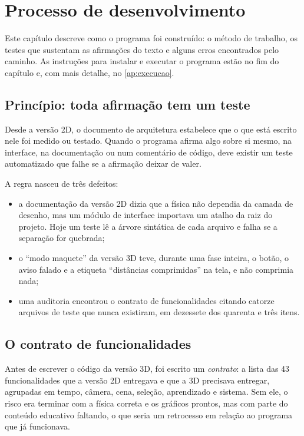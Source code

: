 \chapter{Processo de desenvolvimento}\label{cap:processo}

Este capítulo descreve como o programa foi construído: o método de trabalho, os testes que sustentam as afirmações do texto e alguns erros encontrados pelo caminho. As instruções para instalar e executar o programa estão no fim do capítulo e, com mais detalhe, no \autoref{ap:execucao}.

\section{Princípio: toda afirmação tem um teste}

Desde a versão 2D, o documento de arquitetura estabelece que o que está escrito nele foi medido ou testado. Quando o programa afirma algo sobre si mesmo, na interface, na documentação ou num comentário de código, deve existir um teste automatizado que falhe se a afirmação deixar de valer.

A regra nasceu de três defeitos:

\begin{itemize}
  \item a documentação da versão 2D dizia que a física não dependia da camada de desenho, mas um módulo de interface importava um atalho da raiz do projeto. Hoje um teste lê a árvore sintática de cada arquivo e falha se a separação for quebrada;
  \item o ``modo maquete'' da versão 3D teve, durante uma fase inteira, o botão, o aviso falado e a etiqueta ``distâncias comprimidas'' na tela, e não comprimia nada;
  \item uma auditoria encontrou o contrato de funcionalidades citando catorze arquivos de teste que nunca existiram, em dezessete dos quarenta e três itens.
\end{itemize}

\section{O contrato de funcionalidades}\label{sec:contrato}

Antes de escrever o código da versão 3D, foi escrito um \emph{contrato}: a lista das 43 funcionalidades que a versão 2D entregava e que a 3D precisava entregar, agrupadas em tempo, câmera, cena, seleção, aprendizado e sistema. Sem ele, o risco era terminar com a física correta e os gráficos prontos, mas com parte do conteúdo educativo faltando, o que seria um retrocesso em relação ao programa que já funcionava.

